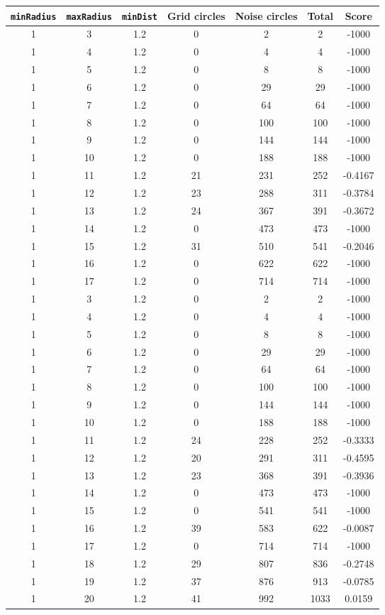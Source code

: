 \documentclass[letterpaper, 12pt]{article}
\begin{document}
\begin{longtable}{|c|c|c|c|c|c|c|}
\hline
\textbf{\texttt{minRadius}} & \textbf{\texttt{maxRadius}} & \textbf{\texttt{minDist}} & \textbf{Grid circles} & \textbf{Noise circles} & \textbf{Total} & \textbf{Score} \\
\hline
1 & 3 & 1.2 & 0 & 2 & 2 & -1000 \\
\hline
1 & 4 & 1.2 & 0 & 4 & 4 & -1000 \\
\hline
1 & 5 & 1.2 & 0 & 8 & 8 & -1000 \\
\hline
1 & 6 & 1.2 & 0 & 29 & 29 & -1000 \\
\hline
1 & 7 & 1.2 & 0 & 64 & 64 & -1000 \\
\hline
1 & 8 & 1.2 & 0 & 100 & 100 & -1000 \\
\hline
1 & 9 & 1.2 & 0 & 144 & 144 & -1000 \\
\hline
1 & 10 & 1.2 & 0 & 188 & 188 & -1000 \\
\hline
1 & 11 & 1.2 & 21 & 231 & 252 & -0.4167 \\
\hline
1 & 12 & 1.2 & 23 & 288 & 311 & -0.3784 \\
\hline
1 & 13 & 1.2 & 24 & 367 & 391 & -0.3672 \\
\hline
1 & 14 & 1.2 & 0 & 473 & 473 & -1000 \\
\hline
1 & 15 & 1.2 & 31 & 510 & 541 & -0.2046 \\
\hline
1 & 16 & 1.2 & 0 & 622 & 622 & -1000 \\
\hline
1 & 17 & 1.2 & 0 & 714 & 714 & -1000 \\
\hline
1 & 3 & 1.2 & 0 & 2 & 2 & -1000 \\
\hline
1 & 4 & 1.2 & 0 & 4 & 4 & -1000 \\
\hline
1 & 5 & 1.2 & 0 & 8 & 8 & -1000 \\
\hline
1 & 6 & 1.2 & 0 & 29 & 29 & -1000 \\
\hline
1 & 7 & 1.2 & 0 & 64 & 64 & -1000 \\
\hline
1 & 8 & 1.2 & 0 & 100 & 100 & -1000 \\
\hline
1 & 9 & 1.2 & 0 & 144 & 144 & -1000 \\
\hline
1 & 10 & 1.2 & 0 & 188 & 188 & -1000 \\
\hline
1 & 11 & 1.2 & 24 & 228 & 252 & -0.3333 \\
\hline
1 & 12 & 1.2 & 20 & 291 & 311 & -0.4595 \\
\hline
1 & 13 & 1.2 & 23 & 368 & 391 & -0.3936 \\
\hline
1 & 14 & 1.2 & 0 & 473 & 473 & -1000 \\
\hline
1 & 15 & 1.2 & 0 & 541 & 541 & -1000 \\
\hline
1 & 16 & 1.2 & 39 & 583 & 622 & -0.0087 \\
\hline
1 & 17 & 1.2 & 0 & 714 & 714 & -1000 \\
\hline
1 & 18 & 1.2 & 29 & 807 & 836 & -0.2748 \\
\hline
1 & 19 & 1.2 & 37 & 876 & 913 & -0.0785 \\
\hline
1 & 20 & 1.2 & 41 & 992 & 1033 & 0.0159 \\
\hline
\end{longtable}
\end{document}
